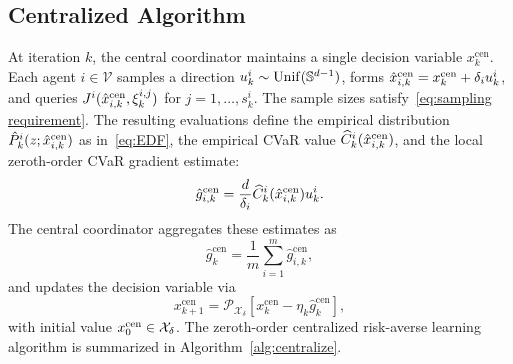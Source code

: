 \documentclass[twocolumn]{autart}    %
\newcommand{\1}{\mathbf{1}}
\begin{document}
\subsection{Centralized Algorithm}\label{sec:centralize alg}
At iteration $k$, the central coordinator maintains a single decision variable $x_k^{\mathrm{cen}}$. 
Each agent $i\in\mathcal V$ samples a direction $u_k^i\sim{\rm Unif}(\mathbb S^{d-1})$, 
forms $\hat{x}_{i,k}^{\rm cen}=x_k^{\rm cen}+\delta_i u_k^i$, 
and queries $J^i(\hat{x}_{i,k}^{\rm cen},\xi_k^{i,j})$ for $j=1,\ldots,s_k^i$. 
The sample sizes satisfy~\eqref{eq:sampling requirement}. 
The resulting evaluations define the empirical distribution $\hat P_k^i(z;\hat{x}_{i,k}^{\rm cen})$ as in~\eqref{eq:EDF}, 
the empirical CVaR value $\widehat C_k^i(\hat{x}_{i,k}^{\rm cen})$, and the local zeroth-order CVaR gradient estimate: 
\begin{equation}\label{eq:cent gradient estimate i}
\hat{g}_{i,k}^{\mathrm{cen}} = \frac{d}{\delta_i}
\widehat{C}_k^i (\hat{x}_{i,k}^{\rm cen})
u_k^i.
\end{equation}
The central coordinator aggregates these estimates as
\begin{equation}\label{eq:cent gradient estimate}
\hat{g}_k^{\mathrm{cen}} = 
\frac{1}{m}\sum_{i=1}^m \hat{g}_{i,k}^{\mathrm{cen}}, 
\end{equation}
and updates the decision variable via
\begin{equation}\label{eq:cent gradient descent}
x_{k+1}^{\mathrm{cen}} = 
\mathcal{P}_{\mathcal{X}_\delta}
\left[
x_k^{\mathrm{cen}}-\eta_k \hat{g}_k^{\mathrm{cen}}
\right],  
\end{equation}
with initial value $x_0^{\rm cen}\in\mathcal X_\delta$.
The zeroth-order centralized risk-averse learning algorithm is summarized in Algorithm~\ref{alg:centralize}. 
\end{document}
